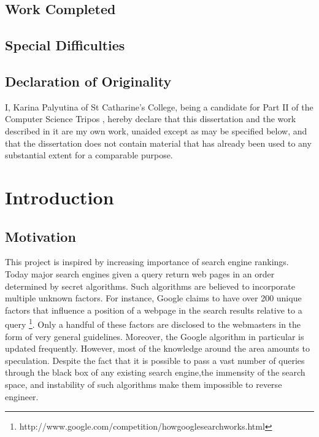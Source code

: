 \documentclass[12pt,notitlepage,twoside]{scrreprt}
\begin{document}
\section*{Work Completed}


\section*{Special Difficulties}

\section*{Declaration of Originality}

I, Karina Palyutina of St Catharine's College, being a candidate for Part II of the Computer
Science Tripos , hereby declare
that this dissertation and the work described in it are my own work,
unaided except as may be specified below, and that the dissertation
does not contain material that has already been used to any substantial
extent for a comparable purpose.

\bigskip
{}

\medskip
{}

\cleardoublepage

\tableofcontents



\cleardoublepage        %

\setcounter{page}{1}
\pagestyle{headings}

\chapter{Introduction}
\section{Motivation}
This project is inspired by increasing importance of search engine rankings.
Today major search engines given a query return web pages in an order
determined by secret algorithms. Such algorithms are believed 
to incorporate multiple unknown factors.
For instance, Google claims to have over 200 unique factors that influence a
position of a webpage in the search results relative to a query
\footnote{http://www.google.com/competition/howgooglesearchworks.html}. Only
a handful of these factors are disclosed to the webmasters  in the form of very
general guidelines. Moreover, the Google algorithm in particular is updated
frequently. However, most of the knowledge around the area amounts to
speculation. Despite the fact that it is possible to pass a vast number of
queries through the black box of any existing search engine,the immensity of
the search space, and instability of such algorithms make them impossible to
reverse engineer.
\end{document}
